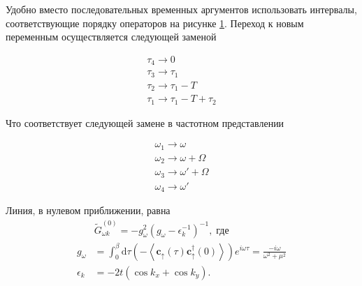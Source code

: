 \documentclass[11pt,a4paper]{report}
\begin{document}
Удобно вместо последовательных временных аргументов использовать интервалы, соответствующие порядку операторов на рисунке \ref{operators}.
Переход к новым переменным осуществляется следующей заменой

\begin{equation}
\begin{split}
\tau_4 \to 0 \\
\tau_3 \to \tau_1 \\
\tau_2 \to \tau_1 - T \\
\tau_1 \to \tau_1 - T + \tau_2
\end{split}
\end{equation}

Что соответствует следующей замене в частотном представлении

\begin{equation}
\begin{split}
\omega_1 \to \omega \\
\omega_2 \to \omega+\Omega \\
\omega_3 \to \omega'+\Omega \\
\omega_4 \to \omega'
\end{split}
\end{equation}

\begin{figure}[H]
\centering
{}
\caption{}
\label{operators}
\end{figure}

Линия, в нулевом приближении, равна
\begin{equation}
\begin{split}
&\tilde{G}^{(0)}_{\omega k} = - g^2_\omega(g_\omega-\epsilon^{-1}_k)^{-1},\;\text{где} \\
g_\omega &= \int_0^\beta \mathrm{d}\tau \left(-\left< \mathbf{c}_\uparrow(\tau)\mathbf{c}^\dag_\uparrow(0) \right>\right) e^{i\omega\tau} = \frac{-i\omega}{\omega^2+\mu^2} \\
\epsilon_k &= - 2 t (\cos k_x+\cos k_y).
\end{split}
\end{equation}
\end{document}
